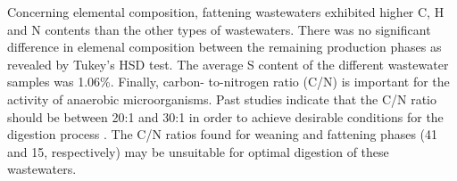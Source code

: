 Concerning elemental composition, fattening wastewaters exhibited higher C, H and N contents than the other types of wastewaters. There was no significant difference in elemenal composition between the remaining production phases as revealed by Tukey's HSD test. The average S content of the different wastewater samples was 1.06\%. Finally, carbon- to-nitrogen ratio (C/N) is important for the activity of anaerobic microorganisms. Past studies indicate that the C/N ratio should be between 20:1 and 30:1 in order to achieve desirable conditions for the digestion process \cite{1,Fricke_2007}. The C/N ratios found for weaning and fattening phases (41 and 15, respectively) may be unsuitable for optimal digestion of these wastewaters.
